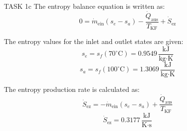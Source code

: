 TASK 1c  
The entropy balance equation is written as:  
\[
0 = \dot{m}_{\text{ein}} (s_e - s_a) - \frac{\dot{Q}_{\text{aus}}}{T_{\text{KF}}} + \dot{S}_{\text{ez}}
\]

The entropy values for the inlet and outlet states are given:  
\[
s_e = s_f(70^\circ\text{C}) = 0.9549 \, \frac{\text{kJ}}{\text{kg·K}}
\]  
\[
s_a = s_f(100^\circ\text{C}) = 1.3069 \, \frac{\text{kJ}}{\text{kg·K}}
\]

The entropy production rate is calculated as:  
\[
\dot{S}_{\text{ez}} = -\dot{m}_{\text{ein}} (s_e - s_a) + \frac{\dot{Q}_{\text{aus}}}{T_{\text{KF}}}
\]  
\[
\dot{S}_{\text{ez}} = 0.3177 \, \frac{\text{kJ}}{\text{K·s}}
\]